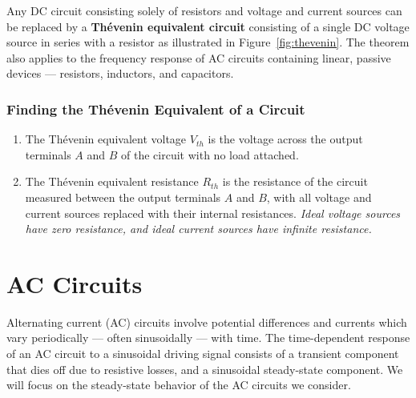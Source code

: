 \documentclass[11pt]{article}
\begin{document}
Any DC circuit consisting solely of resistors and voltage and current
sources can be replaced by a \textbf{Th\'{e}venin equivalent circuit}
consisting of a single DC voltage source in series with a resistor as
illustrated in Figure~\ref{fig:thevenin}. The theorem also applies to
the frequency response of AC circuits containing linear, passive
devices --- resistors, inductors, and capacitors.

\begin{latexonly}
  \noindent
  \hrulefill
\end{latexonly}
\htmlrule
\subsubsection*{Finding the Th\'{e}venin Equivalent of a Circuit}
\begin{enumerate}
\item The Th\'{e}venin equivalent voltage $V_{th}$ is the voltage
  across the output terminals $A$ and $B$ of the circuit with no load
  attached.

\item The Th\'{e}venin equivalent resistance $R_{th}$ is the
  resistance of the circuit measured between the output terminals $A$
  and $B$, with all voltage and current sources replaced with their
  internal resistances. \textit{Ideal voltage sources have zero
    resistance, and ideal current sources have infinite resistance.}
\end{enumerate}
\begin{latexonly}
  \noindent
  \hrulefill
\end{latexonly}
\htmlrule

\newpage

\section{AC Circuits}
\label{sec:AC}

Alternating current (AC) circuits involve potential differences and
currents which vary periodically --- often sinusoidally --- with time.
The time-dependent response of an AC circuit to a sinusoidal driving
signal consists of a transient component that dies off due to
resistive losses, and a sinusoidal steady-state component. We will
focus on the steady-state behavior of the AC circuits we consider.
\end{document}
